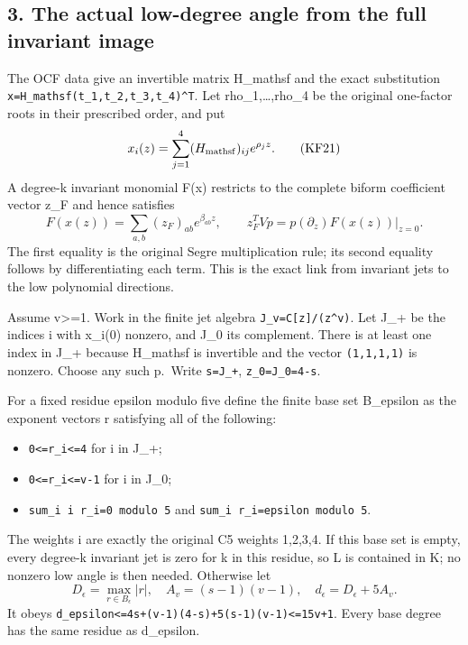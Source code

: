 \subsection{3. The actual low-degree angle from the full invariant image}\label{the-actual-low-degree-angle-from-the-full-invariant-image}

The OCF data give an invertible matrix H\_mathsf and the exact substitution \nolinkurl{x=H_mathsf(t_1,t_2,t_3,t_4)^T}. Let rho\_1,\ldots,rho\_4 be the original one-factor roots in their prescribed order, and put \[
x_i(z)=\sum_{j=1}^4(H_{\rm mathsf})_{ij}e^{\rho_jz}.
\tag{KF21}
\] A degree-k invariant monomial F(x) restricts to the complete biform coefficient vector z\_F and hence satisfies \[
F(x(z))=\sum_{a,b}(z_F)_{ab}e^{\beta_{ab}z},\qquad
z_F^TVp=\left.p(\partial_z)F(x(z))\right|_{z=0}.
\tag{KF22}
\] The first equality is the original Segre multiplication rule; its second equality follows by differentiating each term. This is the exact link from invariant jets to the low polynomial directions.

Assume v\textgreater=1. Work in the finite jet algebra \texttt{J\_v=C{[}z{]}/(z\^{}v)}. Let J\_+ be the indices i with x\_i(0) nonzero, and J\_0 its complement. There is at least one index in J\_+ because H\_mathsf is invertible and the vector \texttt{(1,1,1,1)} is nonzero. Choose any such p.~Write \texttt{s=\textbar{}J\_+\textbar{}}, \texttt{z\_0=\textbar{}J\_0\textbar{}=4-s}.

For a fixed residue epsilon modulo five define the finite base set B\_epsilon as the exponent vectors r satisfying all of the following:

\begin{itemize}
\tightlist
\item
  \texttt{0\textless{}=r\_i\textless{}=4} for i in J\_+;
\item
  \texttt{0\textless{}=r\_i\textless{}=v-1} for i in J\_0;
\item
  \nolinkurl{sum_i i r_i=0 modulo 5} and \nolinkurl{sum_i r_i=epsilon modulo 5}.
\end{itemize}

The weights i are exactly the original C5 weights 1,2,3,4. If this base set is empty, every degree-k invariant jet is zero for k in this residue, so L is contained in K; no nonzero low angle is then needed. Otherwise let \[
D_\epsilon=\max_{r\in B_\epsilon}|r|,\quad
A_v=(s-1)(v-1),\quad d_\epsilon=D_\epsilon+5A_v.
\tag{KF23}
\] It obeys \nolinkurl{d_epsilon<=4s+(v-1)(4-s)+5(s-1)(v-1)<=15v+1}. Every base degree has the same residue as d\_epsilon.

